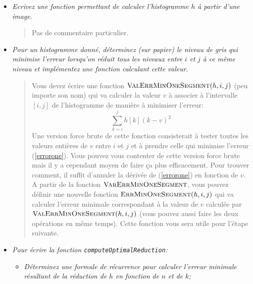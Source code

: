 \documentclass[a4paper,10pt]{article}
\begin{document}
\begin{itemize}
\item {\it Ecrivez une fonction permettant de calculer l'histogramme $h$ à
  partir d'une image.}

\bigskip

\begin{quote}
Pas de commentaire particulier.
\end{quote}

\bigskip

\item {\it Pour un histogramme donné, déterminez (sur papier) le niveau de
  gris qui minimise l'erreur lorsqu'on réduit tous les niveaux entre
  $i$ et $j$ à ce même niveau et implémentez une fonction calculant
  cette valeur.}

\bigskip

\begin{quote}
Vous devez écrire une fonction $\textnormal{\scshape ValErrMinOneSegment}(h,i,j)$ (peu importe son nom)
qui va calculer la valeur $v$ à associer à l'intervalle $[i,j]$ de
l'histogramme de manière à minimiser l'erreur:
\begin{equation}\label{errorone}
\sum_{k=i}^j h[k] (k-v)^2
\end{equation}
Une version force brute de cette fonction consisterait à tester toutes
les valeurs entières de $v$ entre $i$ et $j$ et à prendre celle qui
minimise l'erreur (\ref{errorone}). Vous pouvez vous contenter de
cette version force brute mais il y a cependant moyen de faire ça plus
efficacement. Pour trouver comment, il suffit d'annuler la dérivée de
(\ref{errorone}) en fonction de $v$.\\ A partir de la fonction
$\textnormal{\scshape VarErrMinOneSegment}$, vous pouvez définir une nouvelle
fonction $\textnormal{\scshape ErrMinOneSegment}(h,i,j)$ qui va calculer l'erreur
minimale correspondant à la valeur de $v$ calculée par
$\textnormal{\scshape ValErrMinOneSegment}(h,i,j)$ (vous pouvez aussi faire les deux
opérations en même temps). Cette fonction vous sera utile pour l'étape
suivante.
\end{quote}

\bigskip

\item {\it Pour écrire la fonction \texttt{computeOptimalReduction}:}
\begin{itemize}
\item {\it Déterminez une formule de récurrence pour calculer l'erreur
  minimale résultant de la réduction de $h$ en fonction de $n$ et de
  $k$;}


\end{itemize}
\end{itemize}
\end{document}
